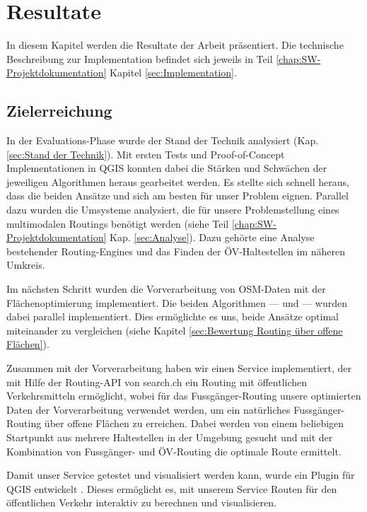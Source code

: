 \section{Resultate}
\label{sec:Resultate}

In diesem Kapitel werden die Resultate der Arbeit präsentiert. Die technische Beschreibung zur Implementation befindet sich jeweils in Teil \ref{chap:SW-Projektdokumentation} Kapitel \ref{sec:Implementation}.

\subsection{Zielerreichung}
\label{sub:Zielerreichung}

In der Evaluations-Phase wurde der Stand der Technik analysiert (Kap. \ref{sec:Stand der Technik}). Mit ersten Tests und Proof-of-Concept Implementationen in QGIS konnten dabei die Stärken und Schwächen der jeweiligen Algorithmen heraus gearbeitet werden. Es stellte sich schnell heraus, dass die beiden Ansätze  und  sich am besten für unser Problem eignen. Parallel dazu wurden die Umsysteme analysiert, die für unsere Problemstellung eines multimodalen Routings benötigt werden (siehe Teil \ref{chap:SW-Projektdokumentation} Kap. \ref{sec:Analyse}). Dazu gehörte eine Analyse bestehender Routing-Engines und das Finden der ÖV-Haltestellen im näheren Umkreis.

Im nächsten Schritt wurden die Vorverarbeitung von \ac{OSM}-Daten mit der Flächenoptimierung implementiert. Die beiden Algorithmen ---  und  --- wurden dabei parallel implementiert. Dies ermöglichte es uns, beide Ansätze optimal miteinander zu vergleichen (siehe Kapitel \ref{sec:Bewertung Routing über offene Flächen}).

Zusammen mit der Vorverarbeitung haben wir einen Service \cite{github:PlazaRoute} implementiert, der mit Hilfe der Routing-API von search.ch \cite{search_ch_route_api} ein Routing mit öffentlichen Verkehrsmitteln ermöglicht, wobei für das Fussgänger-Routing unsere optimierten Daten der Vorverarbeitung verwendet werden, um ein natürliches Fussgänger-Routing über offene Flächen zu erreichen. Dabei werden von einem beliebigen Startpunkt aus mehrere Haltestellen in der Umgebung gesucht und mit der Kombination von Fussgänger- und ÖV-Routing die optimale Route ermittelt.

Damit unser Service getestet und visualisiert werden kann, wurde ein Plugin für QGIS entwickelt \cite{github:PlazaRoute-qgis-plugin}. Dieses ermöglicht es, mit unserem Service Routen für den öffentlichen Verkehr interaktiv zu berechnen und visualisieren.

